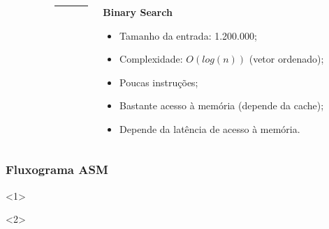 \documentclass{beamer}
\begin{document}
\begin{frame}
\begin{columns}
\begin{column}{0.33\textwidth}
            \end{column}

            \begin{column}{0.01\textwidth}
                \rule{.1mm}{0.75\textheight}
            \end{column}

            \begin{column}{0.33\textwidth}

                \begin{center}
                    \textbf{Binary Search}
                \end{center}

                \begin{itemize}
                    \footnotesize
                    \item Tamanho da entrada: 1.200.000;
                    \item Complexidade: $O(log(n))$ (vetor ordenado);
                    \item Poucas instruções;
                    \item Bastante acesso à memória (depende da cache);
                    \item Depende da latência de acesso à memória.
                \end{itemize}

            \end{column}
        \end{columns}
    \end{frame}

    \begin{frame}
        \frametitle{Fluxograma ASM}

        \begin{onlyenv}<1>
            \begin{figure}[h]
                \centering
            \end{figure}
        \end{onlyenv}

        \begin{onlyenv}<2>
          \begin{figure}[h]
            \centering
          \end{figure}
        \end{onlyenv}
    \end{frame}
\end{document}
